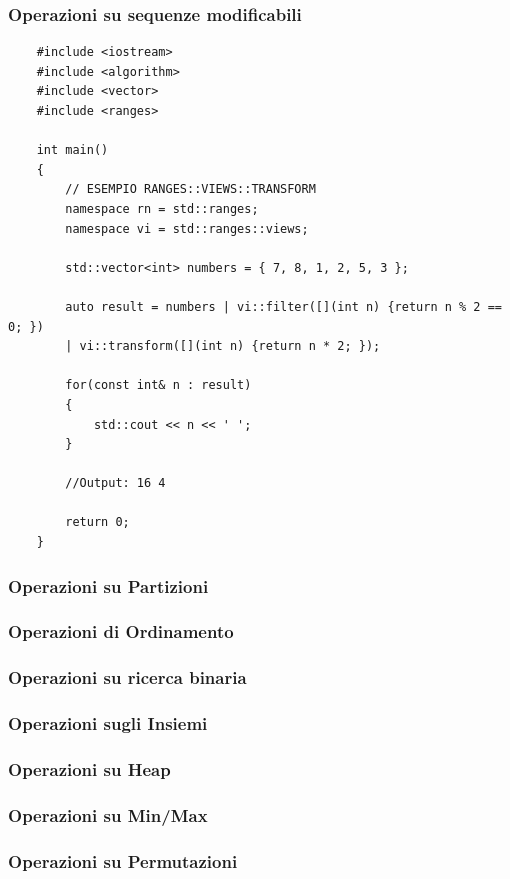 \subsubsection{Operazioni su sequenze modificabili}

\label{ranges_seq_modificabili}

\begin{lstlisting}
	#include <iostream>
	#include <algorithm>
	#include <vector>
	#include <ranges>
	
	int main()
	{
		// ESEMPIO RANGES::VIEWS::TRANSFORM
		namespace rn = std::ranges;
		namespace vi = std::ranges::views;
		
		std::vector<int> numbers = { 7, 8, 1, 2, 5, 3 };
		
		auto result = numbers | vi::filter([](int n) {return n % 2 == 0; })
		| vi::transform([](int n) {return n * 2; });
		
		for(const int& n : result)
		{
			std::cout << n << ' ';
		}
	
		//Output: 16 4
	
		return 0;
	}
\end{lstlisting}

\subsubsection{Operazioni su Partizioni}
\subsubsection{Operazioni di Ordinamento}
\subsubsection{Operazioni su ricerca binaria}
\subsubsection{Operazioni sugli Insiemi}
\subsubsection{Operazioni su Heap}
\subsubsection{Operazioni su Min/Max}
\subsubsection{Operazioni su Permutazioni}
